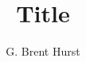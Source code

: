 \documentclass[11pt]{article}
\begin{document}
\title{Title}
\author{G. Brent Hurst}
\maketitle
\end{document}
